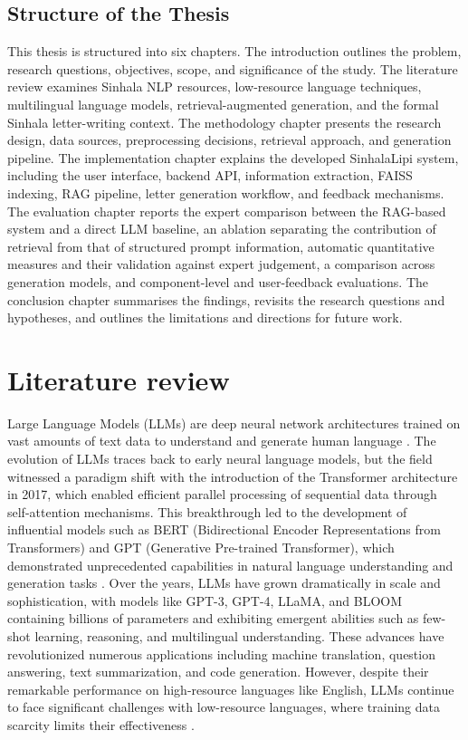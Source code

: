 \documentclass[12pt]{uomthesis}
\begin{document}
\section{Structure of the Thesis}
This thesis is structured into six chapters. The introduction outlines the problem, research questions, objectives, scope, and significance of the study. The literature review examines Sinhala NLP resources, low-resource language techniques, multilingual language models, retrieval-augmented generation, and the formal Sinhala letter-writing context. The methodology chapter presents the research design, data sources, preprocessing decisions, retrieval approach, and generation pipeline. The implementation chapter explains the developed SinhalaLipi system, including the user interface, backend API, information extraction, FAISS indexing, RAG pipeline, letter generation workflow, and feedback mechanisms. The evaluation chapter reports the expert comparison between the RAG-based system and a direct LLM baseline, an ablation separating the contribution of retrieval from that of structured prompt information, automatic quantitative measures and their validation against expert judgement, a comparison across generation models, and component-level and user-feedback evaluations. The conclusion chapter summarises the findings, revisits the research questions and hypotheses, and outlines the limitations and directions for future work.

\chapter{Literature review}

Large Language Models (LLMs) are deep neural network architectures trained on vast amounts of text data to understand and generate human language \cite{33}. The evolution of LLMs traces back to early neural language models, but the field witnessed a paradigm shift with the introduction of the Transformer architecture in 2017, which enabled efficient parallel processing of sequential data through self-attention mechanisms. This breakthrough led to the development of influential models such as BERT (Bidirectional Encoder Representations from Transformers) and GPT (Generative Pre-trained Transformer), which demonstrated unprecedented capabilities in natural language understanding and generation tasks \cite{33}. Over the years, LLMs have grown dramatically in scale and sophistication, with models like GPT-3, GPT-4, LLaMA, and BLOOM \cite{30} \cite{32} containing billions of parameters and exhibiting emergent abilities such as few-shot learning, reasoning, and multilingual understanding. These advances have revolutionized numerous applications including machine translation, question answering, text summarization, and code generation. However, despite their remarkable performance on high-resource languages like English, LLMs continue to face significant challenges with low-resource languages, where training data scarcity limits their effectiveness \cite{33}.
\end{document}
